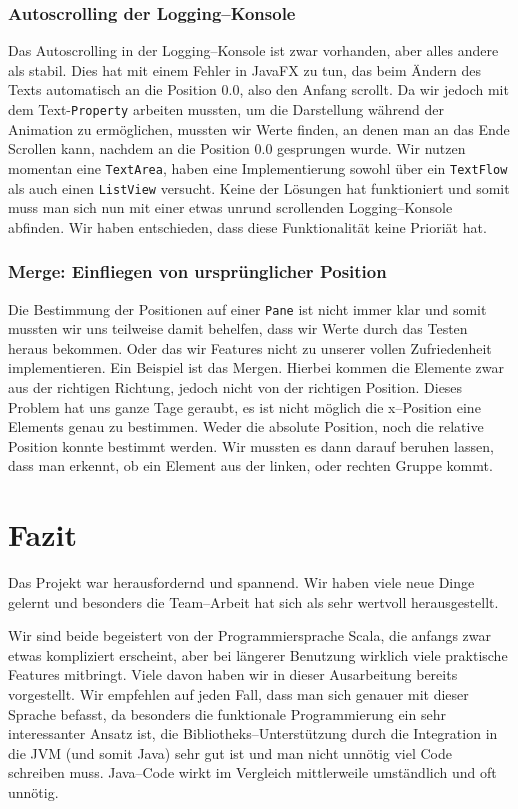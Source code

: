 \subsubsection{Autoscrolling der Logging--Konsole}
Das Autoscrolling in der Logging--Konsole ist zwar vorhanden, aber alles andere als stabil. Dies hat mit einem Fehler in JavaFX zu tun, das beim Ändern des Texts automatisch an die Position 0.0, also den Anfang scrollt. Da wir jedoch mit dem Text-\texttt{Property} arbeiten mussten, um die Darstellung während der Animation zu ermöglichen, mussten wir Werte finden, an denen man an das Ende Scrollen kann, nachdem an die Position 0.0 gesprungen wurde. Wir nutzen momentan eine \texttt{TextArea}, haben eine Implementierung sowohl über ein \texttt{TextFlow} als auch einen \texttt{ListView} versucht. Keine der Lösungen hat funktioniert und somit muss man sich nun mit einer etwas unrund scrollenden Logging--Konsole abfinden. Wir haben entschieden, dass diese Funktionalität keine Prioriät hat.

\subsubsection{Merge: Einfliegen von ursprünglicher Position}
Die Bestimmung der Positionen auf einer \texttt{Pane} ist nicht immer klar und somit mussten wir uns teilweise damit behelfen, dass wir Werte durch das Testen heraus bekommen. Oder das wir Features nicht zu unserer vollen Zufriedenheit implementieren. Ein Beispiel ist das Mergen. Hierbei kommen die Elemente zwar aus der richtigen Richtung, jedoch nicht von der richtigen Position. Dieses Problem hat uns ganze Tage geraubt, es ist nicht möglich die x--Position eine Elements genau zu bestimmen. Weder die absolute Position, noch die relative Position konnte bestimmt werden. Wir mussten es dann darauf beruhen lassen, dass man erkennt, ob ein Element aus der linken, oder rechten Gruppe kommt.

\section{Fazit}\label{sec:fazit}
Das Projekt war herausfordernd und spannend. Wir haben viele neue Dinge gelernt und besonders die Team--Arbeit hat sich als sehr wertvoll herausgestellt.

Wir sind beide begeistert von der Programmiersprache Scala, die anfangs zwar etwas kompliziert erscheint, aber bei längerer Benutzung wirklich viele praktische Features mitbringt. Viele davon haben wir in dieser Ausarbeitung bereits vorgestellt. Wir empfehlen auf jeden Fall, dass man sich genauer mit dieser Sprache befasst, da besonders die funktionale Programmierung ein sehr interessanter Ansatz ist, die Bibliotheks--Unterstützung durch die Integration in die JVM (und somit Java) sehr gut ist und man nicht unnötig viel Code schreiben muss. Java--Code wirkt im Vergleich mittlerweile umständlich und oft unnötig.

